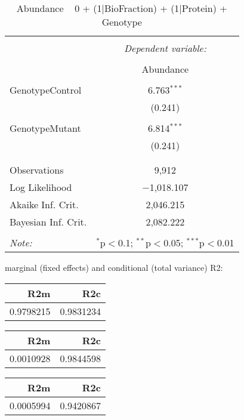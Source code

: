 \documentclass[11pt]{report}
\begin{document}
\begin{table}[!htbp] \centering 
  \caption{Abundance ~ 0 + (1|BioFraction) + (1|Protein) + Genotype} 
  \label{} 
\begin{tabular}{@{\extracolsep{5pt}}lc} 
\\[-1.8ex]\hline 
\hline \\[-1.8ex] 
 & \multicolumn{1}{c}{\textit{Dependent variable:}} \\ 
\cline{2-2} 
\\[-1.8ex] & Abundance \\ 
\hline \\[-1.8ex] 
 GenotypeControl & 6.763$^{***}$ \\ 
  & (0.241) \\ 
  & \\ 
 GenotypeMutant & 6.814$^{***}$ \\ 
  & (0.241) \\ 
  & \\ 
\hline \\[-1.8ex] 
Observations & 9,912 \\ 
Log Likelihood & $-$1,018.107 \\ 
Akaike Inf. Crit. & 2,046.215 \\ 
Bayesian Inf. Crit. & 2,082.222 \\ 
\hline 
\hline \\[-1.8ex] 
\textit{Note:}  & \multicolumn{1}{r}{$^{*}$p$<$0.1; $^{**}$p$<$0.05; $^{***}$p$<$0.01} \\ 
\end{tabular} 
\end{table} 
marginal (fixed effects) and conditional (total variance) R2:

\begin{tabular}{r|r}
\hline
R2m & R2c\\
\hline
0.9798215 & 0.9831234\\
\hline
\end{tabular}

\begin{tabular}{r|r}
\hline
R2m & R2c\\
\hline
0.0010928 & 0.9844598\\
\hline
\end{tabular}

\begin{tabular}{r|r}
\hline
R2m & R2c\\
\hline
0.0005994 & 0.9420867\\
\hline
\end{tabular}
\end{document}
